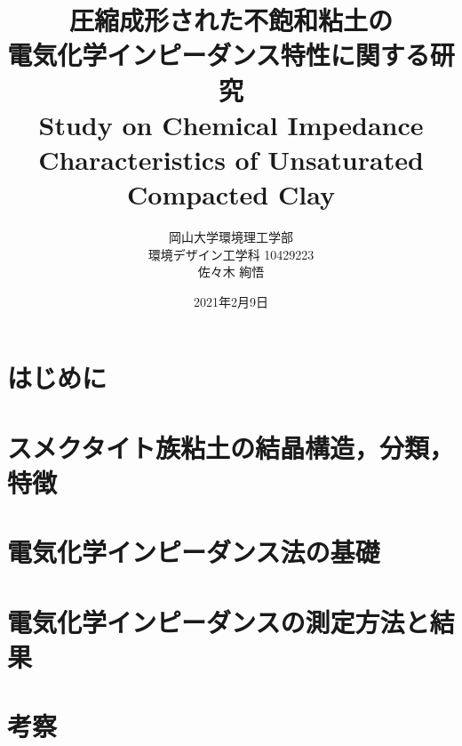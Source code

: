 \documentclass[11pt,a4j]{mybook2}
\title{
\vspace{20mm}
圧縮成形された不飽和粘土の\\
電気化学インピーダンス特性に関する研究
\\
\vspace{5mm}
Study on Chemical Impedance Characteristics 
of Unsaturated Compacted Clay
\vspace{60mm}
}
\date{2021年2月9日}
\author{
	\vspace{40mm}
岡山大学環境理工学部\\
環境デザイン工学科 10429223\\
	佐々木 絢悟}
\begin{document}
\maketitle
\tableofcontents
\frontmatter
\mainmatter
\chapter{はじめに}
	
\chapter{スメクタイト族粘土の結晶構造，分類，特徴}
	
\chapter{電気化学インピーダンス法の基礎}
	
\chapter{電気化学インピーダンスの測定方法と結果}
	
\chapter{考察}
	
\end{document}
